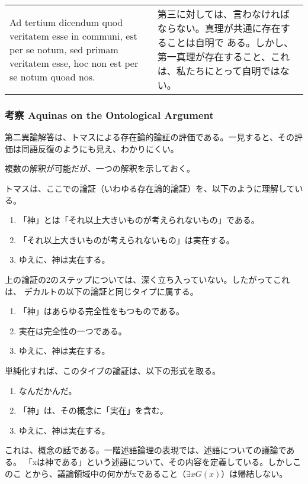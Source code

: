 \documentclass[10pt]{jsarticle}
\begin{document}
\begin{longtable}{p{21em}p{21em}}
\\


{\sc Ad tertium dicendum} quod veritatem esse in communi, est per se
notum, sed primam veritatem esse, hoc non est per se notum quoad nos.


&

第三に対しては、言わなければならない。真理が共通に存在することは自明で
ある。しかし、第一真理が存在すること、これは、私たちにとって自明ではな
い。


\end{longtable}
\newpage
\subsubsection*{考察 Aquinas on the Ontological Argument}
第二異論解答は、トマスによる存在論的論証の評価である。一見すると、その評
価は同語反復のようにも見え、わかりにくい。

複数の解釈が可能だが、一つの解釈を示しておく。

トマスは、ここでの論証（いわゆる存在論的論証）を、以下のように理解してい
る。

\begin{enumerate}
 \item 「神」とは「それ以上大きいものが考えられないもの」である。
 \item 「それ以上大きいものが考えられないもの」は実在する。
 \item ゆえに、神は実在する。
\end{enumerate}

上の論証の2のステップについては、深く立ち入っていない。したがってこれは、
デカルトの以下の論証と同じタイプに属する。

\begin{enumerate}
 \item 「神」はあらゆる完全性をもつものである。
 \item 実在は完全性の一つである。
 \item ゆえに、神は実在する。
\end{enumerate}

単純化すれば、このタイプの論証は、以下の形式を取る。

\begin{enumerate}
 \item なんだかんだ。
 \item 「神」は、その概念に「実在」を含む。
 \item ゆえに、神は実在する。
\end{enumerate}
\noindent
これは、概念の話である。一階述語論理の表現では、述語についての議論である。
「xは神である」という述語について、その内容を定義している。しかしこのこ
とから、議論領域中の何かがxであること（$\exists xG(x)$）は帰結しない。
\end{document}
